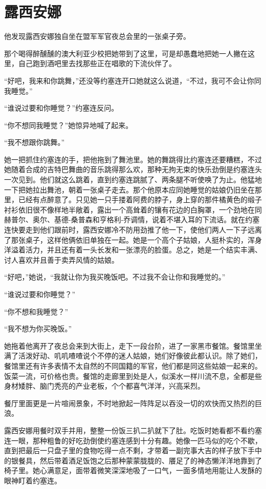 \chapter{露西安娜}
 
    他发现露西安娜独自坐在盟军军官夜总会里的一张桌子旁。

    那个喝得醉醺醺的澳大利亚少校把她带到了这里，可是却愚蠢地把她一人撇在这里，自己跑到酒吧里去找那些正在唱歌的下流伙伴了。

    “好吧，我来和你跳舞，”还没等约塞连开口她就这么说道，“不过，我可不会让你同我睡觉。”

    “谁说过要和你睡觉？”约塞连反问。

    “你不想同我睡觉？”她惊异地喊了起来。

    “我不想跟你跳舞。”

    她一把抓住约塞连的手，把他拖到了舞池里。她的舞跳得比约塞连还要糟糕，不过她随着合成的吉特巴舞曲的音乐跳得那么欢，那种无拘无束的快乐劲倒是约塞连头一次见到。他们就这么跳着，直到约塞连跳腻了、两条腿不听使唤了为止。他猛地一下把她拉出舞池，朝着一张桌子走去。那个他原本应同她睡觉的姑娘仍旧坐在那里，已经有点醉意了。只见她一只手搂着阿费的脖子，身上穿的那件橘黄色的缎子衬衫依旧很不像样地半敞着，露出一个高耸着的镶有花边的白胸罩，一个劲地在同赫普尔、奥尔、基德-桑普森和亨格利-乔调情，说着不堪入耳的下流话。就在约塞连快要走到他们跟前时，露西安娜冷不防用劲推了他一下，使他们两人一下子远离了那张桌子，这样他俩依旧单独在一起。她是一个高个子姑娘，人挺朴实的，浑身洋溢着活力，并且还有着一头长发和一张漂亮的脸蛋。总之，她是一个结实丰满、讨人喜欢并且善于卖弄风情的姑娘。

    “好吧，”她说，“我就让你为我买晚饭吧。不过我不会让你和我睡觉的。”

    “谁说过要和你睡觉？”

    “你不想和我睡觉？”

    “我不想为你买晚饭。”

    她拖着他离开了夜总会来到大街上，走下一段台阶，进了一家黑市餐馆。餐馆里坐满了活泼好动、叽叽喳喳说个不停的迷人姑娘，她们好像彼此都认识。除了她们，餐馆里还有许多表情不太自然的不同国籍的军官，他们都是同这些姑娘一起来的。饭菜一流，可价格也贵。餐馆的走廊里到处是人，似溪水一样川流不息，全都是些身材矮胖、脑门秃亮的产业老板，个个都喜气洋洋，兴高采烈。

    餐厅里面更是一片喧闹景象，不时地掀起一阵阵足以吞没一切的欢快而又热烈的巨浪。

    露西安娜用餐时双手并用，整整一份饭三扒二扒就下了肚。吃饭时她看都不看约塞连一眼，那种粗鲁的好吃劲倒使约塞连感到十分有趣。她像一匹马似的吃个不歇，直到把最后一只盘子里的食物吃得一点不剩，才带着一副完事大吉的样子放下手中的银餐具，然后带着酒足饭饱之后那种蒙蒙胧胧的、餍足了的神态懒洋洋地靠到了椅子里。她心满意足，面带着微笑深深地吸了一口气，一面多情地用能让人发酥的眼神盯着约塞连。

